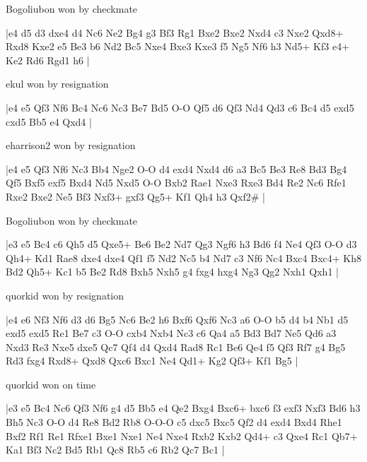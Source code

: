 \showboard

Bogoliubon won by checkmate

\makegametitle
|e4 d5 d3 dxe4 d4 Nc6 Ne2 Bg4 g3 Bf3 Rg1 Bxe2 Bxe2 Nxd4 c3 Nxe2 Qxd8+ Rxd8 Kxe2 e5 Be3 b6 Nd2 Bc5 Nxe4 Bxe3 Kxe3 f5 Ng5 Nf6 h3 Nd5+ Kf3 e4+ Ke2 Rd6 Rgd1 h6  |

\showboard

ekul won by resignation

\makegametitle
|e4 e5 Qf3 Nf6 Bc4 Nc6 Nc3 Be7 Bd5 O-O Qf5 d6 Qf3 Nd4 Qd3 c6 Bc4 d5 exd5 cxd5 Bb5 e4 Qxd4  |

\showboard

eharrison2 won by resignation

\makegametitle
|e4 e5 Qf3 Nf6 Nc3 Bb4 Nge2 O-O d4 exd4 Nxd4 d6 a3 Bc5 Be3 Re8 Bd3 Bg4 Qf5 Bxf5 exf5 Bxd4 Nd5 Nxd5 O-O Bxb2 Rae1 Nxe3 Rxe3 Bd4 Re2 Nc6 Rfe1 Rxe2 Bxe2 Ne5 Bf3 Nxf3+ gxf3 Qg5+ Kf1 Qh4 h3 Qxf2\#  |

\showboard

Bogoliubon won by checkmate

\makegametitle
|e3 e5 Bc4 c6 Qh5 d5 Qxe5+ Be6 Be2 Nd7 Qg3 Ngf6 h3 Bd6 f4 Ne4 Qf3 O-O d3 Qh4+ Kd1 Rae8 dxe4 dxe4 Qf1 f5 Nd2 Nc5 b4 Nd7 c3 Nf6 Nc4 Bxc4 Bxc4+ Kh8 Bd2 Qh5+ Kc1 b5 Be2 Rd8 Bxh5 Nxh5 g4 fxg4 hxg4 Ng3 Qg2 Nxh1 Qxh1  |

\showboard

quorkid won by resignation

\makegametitle
|e4 e6 Nf3 Nf6 d3 d6 Bg5 Nc6 Be2 h6 Bxf6 Qxf6 Nc3 a6 O-O b5 d4 b4 Nb1 d5 exd5 exd5 Re1 Be7 c3 O-O cxb4 Nxb4 Nc3 c6 Qa4 a5 Bd3 Bd7 Ne5 Qd6 a3 Nxd3 Re3 Nxe5 dxe5 Qc7 Qf4 d4 Qxd4 Rad8 Rc1 Be6 Qe4 f5 Qf3 Rf7 g4 Bg5 Rd3 fxg4 Rxd8+ Qxd8 Qxc6 Bxc1 Ne4 Qd1+ Kg2 Qf3+ Kf1 Bg5  |

\showboard

quorkid won on time

\makegametitle
|e3 e5 Bc4 Nc6 Qf3 Nf6 g4 d5 Bb5 e4 Qe2 Bxg4 Bxc6+ bxc6 f3 exf3 Nxf3 Bd6 h3 Bh5 Nc3 O-O d4 Re8 Bd2 Rb8 O-O-O c5 dxc5 Bxc5 Qf2 d4 exd4 Bxd4 Rhe1 Bxf2 Rf1 Re1 Rfxe1 Bxe1 Nxe1 Ne4 Nxe4 Rxb2 Kxb2 Qd4+ c3 Qxe4 Rc1 Qb7+ Ka1 Bf3 Nc2 Bd5 Rb1 Qc8 Rb5 c6 Rb2 Qc7 Bc1  |

